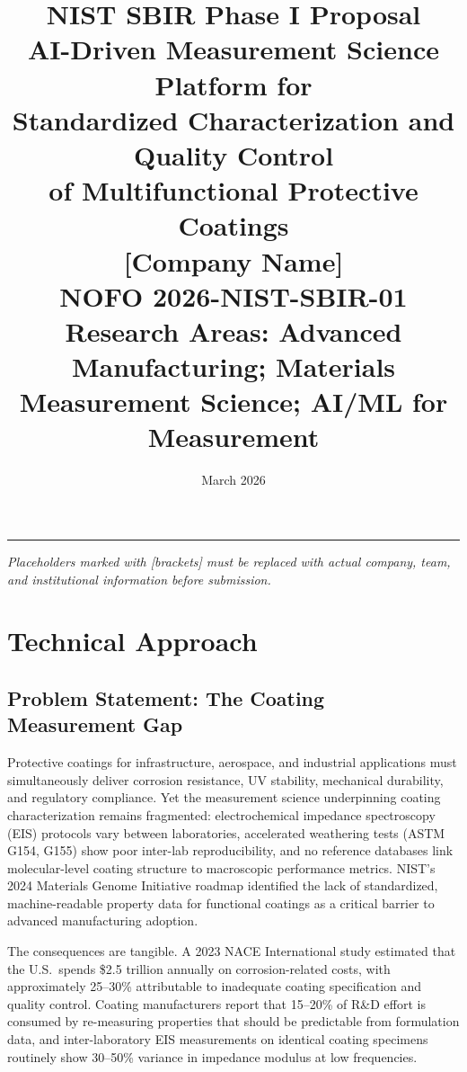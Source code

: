 \documentclass[11pt,letterpaper]{article}
\title{%
  \vspace{-1cm}
  \textcolor{nistblue}{\Large\textbf{NIST SBIR Phase I Proposal}}\\[0.3cm]
  \textbf{AI-Driven Measurement Science Platform for\\Standardized Characterization and Quality Control\\of Multifunctional Protective Coatings}\\[0.3cm]
  \large [Company Name]\\[0.2cm]
  \normalsize NOFO 2026-NIST-SBIR-01\\
  \normalsize Research Areas: Advanced Manufacturing; Materials Measurement Science; AI/ML for Measurement
}
\author{}
\date{March 2026}
\begin{document}
\maketitle
\thispagestyle{fancy}

\noindent\textcolor{nistblue}{\rule{\textwidth}{1.5pt}}

\vspace{0.3cm}
\noindent\textit{Placeholders marked with [brackets] must be replaced with actual company, team, and institutional information before submission.}

\vspace{0.3cm}

\section{Technical Approach}
\label{sec:technical}

\subsection{Problem Statement: The Coating Measurement Gap}

Protective coatings for infrastructure, aerospace, and industrial applications must simultaneously deliver corrosion resistance, UV stability, mechanical durability, and regulatory compliance. Yet the measurement science underpinning coating characterization remains fragmented: electrochemical impedance spectroscopy (EIS) protocols vary between laboratories, accelerated weathering tests (ASTM G154, G155) show poor inter-lab reproducibility, and no reference databases link molecular-level coating structure to macroscopic performance metrics. NIST's 2024 Materials Genome Initiative roadmap identified the lack of standardized, machine-readable property data for functional coatings as a critical barrier to advanced manufacturing adoption.

The consequences are tangible. A 2023 NACE International study estimated that the U.S.\ spends \$2.5 trillion annually on corrosion-related costs, with approximately 25--30\% attributable to inadequate coating specification and quality control. Coating manufacturers report that 15--20\% of R\&D effort is consumed by re-measuring properties that should be predictable from formulation data, and inter-laboratory EIS measurements on identical coating specimens routinely show 30--50\% variance in impedance modulus at low frequencies.
\end{document}
